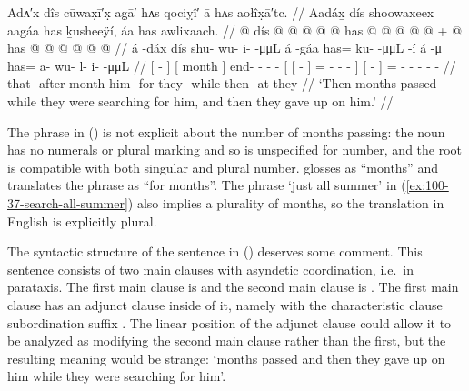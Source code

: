 \ex\label{ex:100-38-month-passed-give-up}%
%
\begingl
	\glpreamble	Adᴀ′x dîs cūwax̣ī′x̣ ag̣ā′ hᴀs qociỵî′ ā hᴀs aołîx̣ā′tc. //
	\glpreamble	Aadáx̱ dís shoowaxeex aag̱áa has ḵusheeÿí, áa has awlixaach. //
	\gla	{}  @ {} {}
		{} dís {}  @ {} @ {} @ {} @ {}
		{} {}  @ {} {}
		has @  @ {} @ {} @ {} @ {} +
		{}  @ {} {} has @  @ {} @ {} @ {} @ {} @ {} //
	\glb	{} á -dáx̱ {}
		{} dís {} shu- wu- i-  -μμL
		{} {} á -g̱áa {} has= ḵu-  -μμL -í {}
		{} á -μ {} 
		has= a- wu- l- i-  -μμL //
	\glc	{}[  - {}]
		{}[ month {}] end- - -  -
		{}[ {}[  - {}]
			= -  - - {}]
		{}[  - {}]
		= - - - -  - //
	\gld	{} that -after {} 
		{} month {}  {} {} {} {}
		{} {} him -for {}
			they  {} {} -while {}
		{} then -at {}
		they  {} {} {} {} {} //
	\glft	‘Then months passed while they were searching for him, and then they gave up on him.’
		//
\endgl
\xe

The phrase  in (\lastx) is not explicit about the number of months passing: the noun has no numerals or plural marking and so is unspecified for number, and the root is compatible with both singular and plural number.
\citeauthor{swanton:1909} glosses  as “months” and translates the phrase as “for months”.
The phrase  ‘just all summer’ in (\ref{ex:100-37-search-all-summer}) also implies a plurality of months, so the translation in English is explicitly plural.

The syntactic structure of the sentence in (\lastx) deserves some comment.
This sentence consists of two main clauses with asyndetic coordination, i.e.\ in parataxis.
The first main clause is  and the second main clause is .
The first main clause has an adjunct clause inside of it, namely  with the characteristic clause subordination suffix .
The linear position of the adjunct clause could allow it to be analyzed as modifying the second main clause rather than the first, but the resulting meaning would be strange: ‘months passed and then they gave up on him while they were searching for him’.

